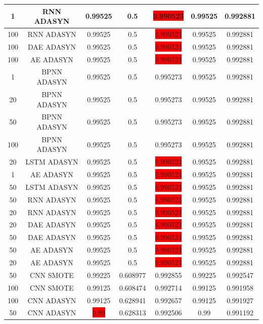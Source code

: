 \begin{longtable}{|c|c|c|c|c|c|c|}
	1 & RNN ADASYN & 0.99525 & 0.5 & \colorbox{red}{0.990523} & 0.99525 & 0.992881\\ \hline
	100 & RNN ADASYN & 0.99525 & 0.5 & \colorbox{red}{0.990523} & 0.99525 & 0.992881\\ \hline
	100 & DAE ADASYN & 0.99525 & 0.5 & \colorbox{red}{0.990523} & 0.99525 & 0.992881\\ \hline
	100 & AE ADASYN & 0.99525 & 0.5 & \colorbox{red}{0.990523} & 0.99525 & 0.992881\\ \hline
	1 & BPNN ADASYN & 0.99525 & 0.5 & 0.995273 & 0.99525 & 0.992881\\ \hline
	20 & BPNN ADASYN & 0.99525 & 0.5 & 0.995273 & 0.99525 & 0.992881\\ \hline
	50 & BPNN ADASYN & 0.99525 & 0.5 & 0.995273 & 0.99525 & 0.992881\\ \hline
	100 & BPNN ADASYN & 0.99525 & 0.5 & 0.995273 & 0.99525 & 0.992881\\ \hline
	20 & LSTM ADASYN & 0.99525 & 0.5 & \colorbox{red}{0.990523} & 0.99525 & 0.992881\\ \hline
	1 & AE ADASYN & 0.99525 & 0.5 & \colorbox{red}{0.990523} & 0.99525 & 0.992881\\ \hline
	50 & LSTM ADASYN & 0.99525 & 0.5 & \colorbox{red}{0.990523} & 0.99525 & 0.992881\\ \hline
	50 & RNN ADASYN & 0.99525 & 0.5 & \colorbox{red}{0.990523} & 0.99525 & 0.992881\\ \hline
	20 & RNN ADASYN & 0.99525 & 0.5 & \colorbox{red}{0.990523} & 0.99525 & 0.992881\\ \hline
	20 & DAE ADASYN & 0.99525 & 0.5 & \colorbox{red}{0.990523} & 0.99525 & 0.992881\\ \hline
	50 & DAE ADASYN & 0.99525 & 0.5 & \colorbox{red}{0.990523} & 0.99525 & 0.992881\\ \hline
	50 & AE ADASYN & 0.99525 & 0.5 & \colorbox{red}{0.990523} & 0.99525 & 0.992881\\ \hline
	20 & AE ADASYN & 0.99525 & 0.5 & \colorbox{red}{0.990523} & 0.99525 & 0.992881\\ \hline
	50 & CNN SMOTE & 0.99225 & 0.608977 & 0.992855 & 0.99225 & 0.992547\\ \hline
	100 & CNN SMOTE & 0.99125 & 0.608474 & 0.992714 & 0.99125 & 0.991958\\ \hline
	100 & CNN ADASYN & 0.99125 & 0.628941 & 0.992657 & 0.99125 & 0.991927\\ \hline
	50 & CNN ADASYN & \colorbox{red}{0.99} & 0.628313 & 0.992506 & 0.99 & 0.991192\\ \hline

\end{longtable}
